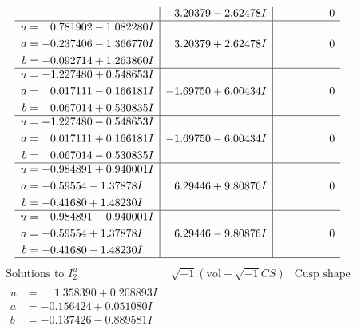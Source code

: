 \documentclass[1p]{elsarticle_modified}
\theoremstyle{definition}
\newcommand{\I}{\sqrt{-1}}
\begin{document}
$$\begin{array}{c|c|c}
 & \phantom{-}3.20379 - 2.62478 I & \phantom{-0.000000 } 0 \\ \hline\begin{aligned}
u &= \phantom{-}0.781902 - 1.082280 I \\
a &= -0.237406 - 1.366770 I \\
b &= -0.092714 + 1.263860 I\end{aligned}
 & \phantom{-}3.20379 + 2.62478 I & \phantom{-0.000000 } 0 \\ \hline\begin{aligned}
u &= -1.227480 + 0.548653 I \\
a &= \phantom{-}0.017111 - 0.166181 I \\
b &= \phantom{-}0.067014 + 0.530835 I\end{aligned}
 & -1.69750 + 6.00434 I & \phantom{-0.000000 } 0 \\ \hline\begin{aligned}
u &= -1.227480 - 0.548653 I \\
a &= \phantom{-}0.017111 + 0.166181 I \\
b &= \phantom{-}0.067014 - 0.530835 I\end{aligned}
 & -1.69750 - 6.00434 I & \phantom{-0.000000 } 0 \\ \hline\begin{aligned}
u &= -0.984891 + 0.940001 I \\
a &= -0.59554 - 1.37878 I \\
b &= -0.41680 + 1.48230 I\end{aligned}
 & \phantom{-}6.29446 + 9.80876 I & \phantom{-0.000000 } 0 \\ \hline\begin{aligned}
u &= -0.984891 - 0.940001 I \\
a &= -0.59554 + 1.37878 I \\
b &= -0.41680 - 1.48230 I\end{aligned}
 & \phantom{-}6.29446 - 9.80876 I & \phantom{-0.000000 } 0\\
 \hline 
 \end{array}$$\newpage$$\begin{array}{c|c|c}  
\text{Solutions to }I^u_{2}& \I (\text{vol} + \sqrt{-1}CS) & \text{Cusp shape}\\
 \hline 
\begin{aligned}
u &= \phantom{-}1.358390 + 0.208893 I \\
a &= -0.156424 + 0.051080 I \\
b &= -0.137426 - 0.889581 I\end{aligned}

\end{array}$$
\end{document}
